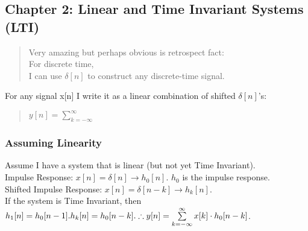 \documentclass{article}
\begin{document}
\subsection{Chapter 2: Linear and Time Invariant Systems (LTI)}
\begin{quote}
    Very amazing but perhaps obvious is retrospect fact:
    \\For discrete time,
    \\I can use $\delta[n]$ to construct any discrete-time signal.
\end{quote}
For any signal x[n] I write it as a linear combination of shifted
$\delta[n]$'s:
\begin{quote}
    $y[n] = \sum\limits_{k = -\infty}^\infty $
\end{quote}
\subsubsection{Assuming Linearity}
Assume I have a system that is linear (but not yet Time Invariant).
\\Impulse Response: $x[n]=\delta[n] \rightarrow h_0[n]$. $h_0$ is the
impulse response.
\\Shifted Impulse Response: $x[n]=\delta[n-k] \rightarrow h_k[n]$.
\\If the system is Time Invariant, then
\\ $h_1[n] = h_0[n-1].
\\ h_k[n] = h_0[n-k].
\\\therefore y[n] = \sum\limits_{k = -\infty}^\infty x[k] \cdot h_0[n-k]$.
\end{document}
